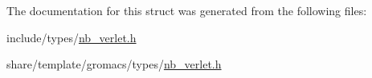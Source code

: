 \-The documentation for this struct was generated from the following files\-:\begin{DoxyCompactItemize}
\item 
include/types/\hyperlink{include_2types_2nb__verlet_8h}{nb\-\_\-verlet.\-h}\item 
share/template/gromacs/types/\hyperlink{share_2template_2gromacs_2types_2nb__verlet_8h}{nb\-\_\-verlet.\-h}\end{DoxyCompactItemize}
